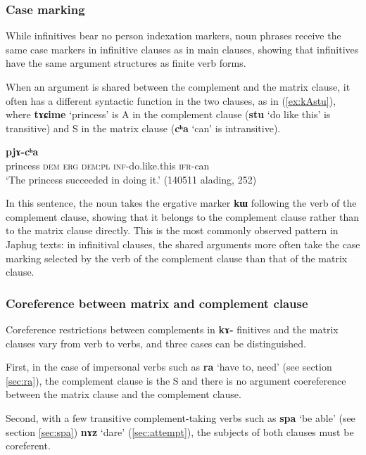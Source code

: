\documentclass[oneside,a4paper,11pt]{article}
\newcommand{\ipa}[1]{\textbf{\phon#1}} %
\newcommand{\jpg}[2]{\ipa{#1} `#2'} %
\newcommand{\refb}[1]{(\ref{#1})}
\begin{document}
\subsubsection{Case marking} \label{sec:case.infinitive}
While infinitives bear no person indexation markers, noun phrases receive the same case markers in infinitive clauses as in main clauses, showing that infinitives have the same argument structures as finite verb forms.

When an argument is shared between the complement and the matrix clause, it often has a different syntactic function in the two clauses, as in \refb{ex:kAstu}, where \ipa{tɤɕime} `princess' is A in the complement clause (\jpg{stu}{do like this} is transitive) and S in the matrix clause (\jpg{cʰa}{can} is intransitive). 

\begin{exe}
\ex \label{ex:kAstu}
\gll [\ipa{tɤɕime} 	\ipa{nɯ} 	\ipa{kɯ} 	\ipa{nɯra} 	\ipa{kɤ-stu}] 	\ipa{pjɤ-cʰa} \\
princess \textsc{dem} \textsc{erg} \textsc{dem:pl} \textsc{inf}-do.like.this \textsc{ifr}-can \\
\glt `The princess succeeded in doing it.' (140511 alading, 252)
\end{exe}

In this sentence, the noun takes the ergative marker \ipa{kɯ} following the verb of the complement clause, showing that it belongs to the complement clause rather than to the matrix clause directly. This is the most commonly observed pattern in Japhug texts: in infinitival clauses, the shared arguments more often take the case marking selected by the verb of the complement clause than that of the matrix clause.

\subsubsection{Coreference between matrix and complement clause} \label{sec:inf.coref}
Coreference restrictions between complements in \ipa{kɤ-} finitives and the matrix clauses vary from verb to verbs, and three cases can be distinguished.


First, in the case of impersonal verbs such as \jpg{ra}{have to, need} (see section \ref{sec:ra}), the complement clause is the S and there is no argument coereference between the matrix clause and the complement clause.

Second, with a few transitive complement-taking verbs such as \ipa{spa} `be able' (see section \ref{sec:spa})  \ipa{nɤz} `dare' (\ref{sec:attempt}), the subjects of both clauses must be coreferent.
\end{document}
